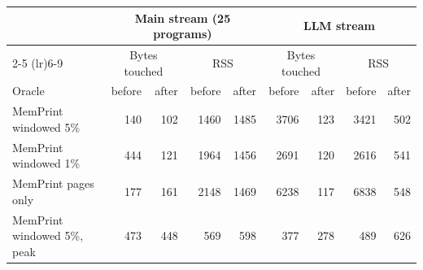 \begin{tabular}{lrrrrrrrr}
\toprule
 & \multicolumn{4}{c}{Main stream (25 programs)} & \multicolumn{4}{c}{LLM stream} \\
\cmidrule(lr){2-5} \cmidrule(lr){6-9}
 & \multicolumn{2}{c}{Bytes touched} & \multicolumn{2}{c}{RSS} & \multicolumn{2}{c}{Bytes touched} & \multicolumn{2}{c}{RSS} \\
Oracle & before & after & before & after & before & after & before & after \\
\midrule
MemPrint windowed 5\% & 140 & 102 & 1460 & 1485 & 3706 & 123 & 3421 & 502 \\
MemPrint windowed 1\% & 444 & 121 & 1964 & 1456 & 2691 & 120 & 2616 & 541 \\
MemPrint pages only & 177 & 161 & 2148 & 1469 & 6238 & 117 & 6838 & 548 \\
MemPrint windowed 5\%, peak & 473 & 448 & 569 & 598 & 377 & 278 & 489 & 626 \\
\bottomrule
\end{tabular}
